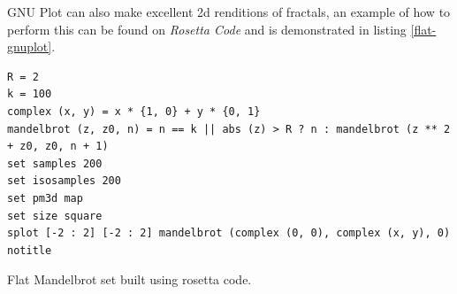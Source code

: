 \documentclass[11pt]{article}
\begin{document}
GNU Plot can also make excellent 2d renditions of fractals, an example of how to
perform this can be found on \emph{Rosetta Code} \cite{MandelbrotSetRosetta} and is demonstrated in listing \ref{flat-gnuplot}.


\begin{listing}[htbp]
\begin{verbatim}
R = 2
k = 100
complex (x, y) = x * {1, 0} + y * {0, 1}
mandelbrot (z, z0, n) = n == k || abs (z) > R ? n : mandelbrot (z ** 2 + z0, z0, n + 1)
set samples 200
set isosamples 200
set pm3d map
set size square
splot [-2 : 2] [-2 : 2] mandelbrot (complex (0, 0), complex (x, y), 0) notitle
\end{verbatim}
\caption{\label{flat-gnuplot}Flat Mandelbrot set built using rosetta code.}
\end{listing}
\end{document}
